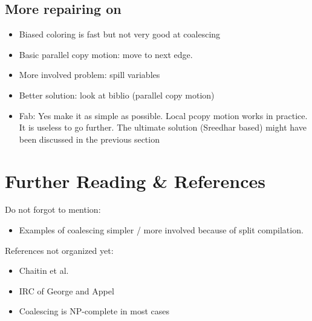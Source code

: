 {\subsection{More repairing on \phifuns}
\begin{itemize}
  \item Biased coloring is fast but not very good at coalescing
  \item Basic parallel copy motion: move to next edge.
  \item More involved problem: spill variables
  \item Better solution: look at biblio (parallel copy motion)
  \item Fab: Yes make it as simple as possible. Local pcopy motion works in practice. It is useless to go further. The ultimate solution (Sreedhar based) might have been discussed in the previous section
\end{itemize}


\section{Further Reading \& References}

Do not forgot to mention:
\begin{itemize}
  \item Examples of coalescing simpler / more involved because of split compilation.
\end{itemize}

References not organized yet:
\begin{itemize}
\item Chaitin et al.~\cite{chaitin:1981:register}
\item IRC of George and Appel~\cite{george:96:iterated}
\item Coalescing is NP-complete in most cases~\cite{BouchezDR07:coalescing-cplx}
\end{itemize}

\endofchapter
}
